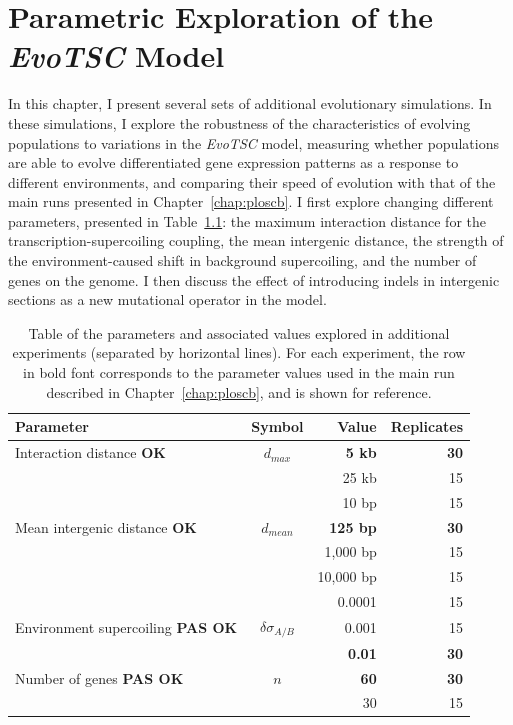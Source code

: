 \chapter{Parametric Exploration of the \emph{EvoTSC} Model}
\label{chap:param}

In this chapter, I present several sets of additional evolutionary simulations.
In these simulations, I explore the robustness of the characteristics of evolving populations to variations in the \emph{EvoTSC} model, measuring whether populations are able to evolve differentiated gene expression patterns as a response to different environments, and comparing their speed of evolution with that of the main runs presented in Chapter~\ref{chap:ploscb}.
I first explore changing different parameters, presented in Table~\ref{tab:param:params}: the maximum interaction distance for the transcription-supercoiling coupling, the mean intergenic distance, the strength of the environment-caused shift in background supercoiling, and the number of genes on the genome.
I then discuss the effect of introducing indels in intergenic sections as a new mutational operator in the model.

\begin{table}
\begin{center}
\begin{tabular}{l c r r}
\toprule
\textbf{Parameter} & \textbf{Symbol} & \textbf{Value} & \textbf{Replicates} \\
\midrule
Interaction distance \textbf{OK} & $d_{max}$ & \textbf{5 kb} & \textbf{30}\\
& & 25 kb & 15\\
\midrule
& & 10 bp& 15\\
Mean intergenic distance \textbf{OK} & $d_{mean}$ & \textbf{125 bp} & \textbf{30} \\
& & 1,000 bp & 15\\
& & 10,000 bp & 15 \\
\midrule
& & 0.0001 & 15\\
Environment supercoiling \textbf{PAS OK}& $\delta\sigma_{A/B}$ & 0.001 & 15\\
& & \textbf{0.01} & \textbf{30}\\
\midrule
Number of genes \textbf{PAS OK} & $n$ & \textbf{60} & \textbf{30} \\
& & 30 & 15 \\
\bottomrule
\end{tabular}
\end{center}
\caption[Table of parameter values explored in additional \emph{EvoTSC} simulations]{Table of the parameters and associated values explored in additional experiments (separated by horizontal lines).
For each experiment, the row in bold font corresponds to the parameter values used in the main run described in Chapter~\ref{chap:ploscb}, and is shown for reference.}
\label{tab:param:params}
\end{table}

